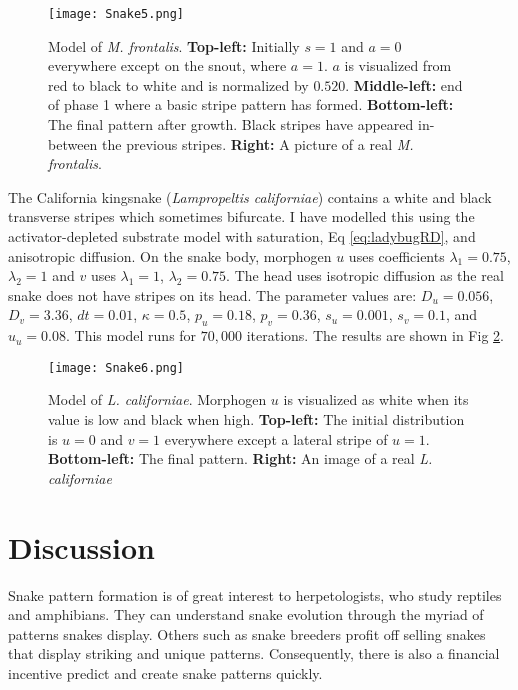 \begin{figure}[ht]
	\centering
	\texttt{[image: Snake5.png]}
	\caption{Model of \textit{M. frontalis}. \textbf{Top-left:} Initially $s=1$ and $a=0$ everywhere except on the snout, where $a=1$. $a$ is visualized from red to black to white and is normalized by $0.520$. \textbf{Middle-left:} end of phase 1 where a basic stripe pattern has formed. \textbf{Bottom-left:} The final pattern after growth. Black stripes have appeared in-between the previous stripes. \textbf{Right:} A picture of a real \textit{M. frontalis}.}
	\label{fig:Snake5}
\end{figure}

\newpage 

The California kingsnake (\textit{Lampropeltis californiae}) contains a white and black transverse stripes which sometimes bifurcate. I have modelled this using the activator-depleted substrate model with saturation, Eq \ref{eq:ladybugRD}, and anisotropic diffusion. On the snake body, morphogen $u$ uses coefficients $\lambda_{1}=0.75$, $\lambda_{2}=1$ and $v$ uses $\lambda_{1}=1$, $\lambda_{2}=0.75$. The head uses isotropic diffusion as the real snake does not have stripes on its head. The parameter values are: $D_u=0.056$, $D_v=3.36$, $dt=0.01$, $\kappa=0.5$, $p_u=0.18$, $p_v=0.36$, $s_u=0.001$, $s_v=0.1$, and $u_u=0.08$. This model runs for $70,000$ iterations. The results are shown in Fig \ref{fig:Snake6}.

\begin{figure}[h]
	\centering
	\texttt{[image: Snake6.png]}
	\caption{Model of \textit{L. californiae}. Morphogen $u$ is visualized as white when its value is low and black when high. \textbf{Top-left:} The initial distribution is $u=0$ and $v=1$ everywhere except a lateral stripe  of $u=1$. \textbf{Bottom-left:} The final pattern. \textbf{Right:} An image of a real \textit{L. californiae}}
	\label{fig:Snake6}
\end{figure}

\newpage

\section{Discussion}
Snake pattern formation is of great interest to herpetologists, who study reptiles and amphibians. They can understand snake evolution through the myriad of patterns snakes display. Others such as snake breeders profit off selling snakes that display striking and unique patterns. Consequently, there is also a financial incentive predict and create snake patterns quickly. 

